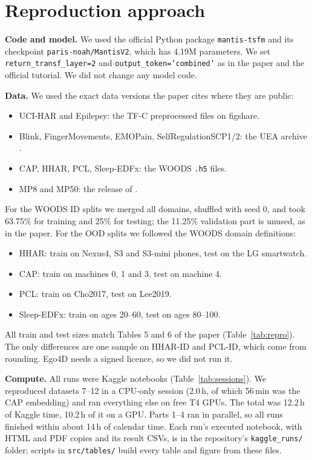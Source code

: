 \documentclass[conference]{IEEEtran}
\begin{document}
\section{Reproduction approach}\label{sec:repro}

\textbf{Code and model.} We used the official Python package \texttt{mantis-tsfm} and its checkpoint
\texttt{paris-noah/MantisV2}, which has 4.19M parameters. We set \texttt{return\_transf\_layer=2} and
\texttt{output\_token='combined'} as in the paper and the official tutorial. We did not change any model code.

\textbf{Data.} We used the exact data versions the paper cites where they are public:
\begin{itemize}
\item UCI-HAR and Epilepsy: the TF-C preprocessed files \cite{tfc} on figshare.
\item Blink, FingerMovements, EMOPain, SelfRegulationSCP1/2: the UEA archive \cite{uea}.
\item CAP, HHAR, PCL, Sleep-EDFx: the WOODS \cite{woods} \texttt{.h5} files.
\item MP8 and MP50: the release of \cite{fm4mtsc}.
\end{itemize}
For the WOODS ID splits we merged all domains, shuffled with seed 0, and took 63.75\% for training and 25\% for
testing; the 11.25\% validation part is unused, as in the paper. For the OOD splits we followed the WOODS domain
definitions:
\begin{itemize}
\item HHAR: train on Nexus4, S3 and S3-mini phones, test on the LG smartwatch.
\item CAP: train on machines 0, 1 and 3, test on machine 4.
\item PCL: train on Cho2017, test on Lee2019.
\item Sleep-EDFx: train on ages 20--60, test on ages 80--100.
\end{itemize}
All train and test sizes match Tables 5 and 6 of the paper (Table~\ref{tab:repro}). The only differences are one
sample on HHAR-ID and PCL-ID, which come from rounding. Ego4D \cite{ego4d} needs a signed licence, so we did not run
it.

\textbf{Compute.} All runs were Kaggle notebooks (Table~\ref{tab:sessions}). We reproduced datasets 7--12 in a
CPU-only session (2.0\,h, of which 56\,min was the CAP embedding) and ran everything else on free T4 GPUs. The total
was 12.2\,h of Kaggle time, 10.2\,h of it on a GPU. Parts 1--4 ran in parallel, so all runs finished within about
14\,h of calendar time. Each run's executed notebook, with HTML and PDF copies and its result CSVs, is in the
repository's \texttt{kaggle\_runs/} folder; scripts in \texttt{src/tables/} build every table and figure from these files.
\end{document}
